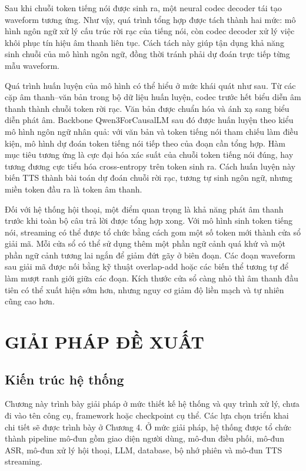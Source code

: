 \documentclass[a4paper,13pt,twoside]{report}
\begin{document}
Sau khi chuỗi token tiếng nói được sinh ra, một neural codec decoder tái tạo waveform tương ứng. Như vậy, quá trình tổng hợp được tách thành hai mức: mô hình ngôn ngữ xử lý cấu trúc rời rạc của tiếng nói, còn codec decoder xử lý việc khôi phục tín hiệu âm thanh liên tục. Cách tách này giúp tận dụng khả năng sinh chuỗi của mô hình ngôn ngữ, đồng thời tránh phải dự đoán trực tiếp từng mẫu waveform.

Quá trình huấn luyện của mô hình có thể hiểu ở mức khái quát như sau. Từ các cặp âm thanh--văn bản trong bộ dữ liệu huấn luyện, codec trước hết biểu diễn âm thanh thành chuỗi token rời rạc. Văn bản được chuẩn hóa và ánh xạ sang biểu diễn phát âm. Backbone Qwen3ForCausalLM sau đó được huấn luyện theo kiểu mô hình ngôn ngữ nhân quả: với văn bản và token tiếng nói tham chiếu làm điều kiện, mô hình dự đoán token tiếng nói tiếp theo của đoạn cần tổng hợp. Hàm mục tiêu tương ứng là cực đại hóa xác suất của chuỗi token tiếng nói đúng, hay tương đương cực tiểu hóa cross-entropy trên token sinh ra. Cách huấn luyện này biến TTS thành bài toán dự đoán chuỗi rời rạc, tương tự sinh ngôn ngữ, nhưng miền token đầu ra là token âm thanh.

Đối với hệ thống hội thoại, một điểm quan trọng là khả năng phát âm thanh trước khi toàn bộ câu trả lời được tổng hợp xong. Với mô hình sinh token tiếng nói, streaming có thể được tổ chức bằng cách gom một số token mới thành cửa sổ giải mã. Mỗi cửa sổ có thể sử dụng thêm một phần ngữ cảnh quá khứ và một phần ngữ cảnh tương lai ngắn để giảm đứt gãy ở biên đoạn. Các đoạn waveform sau giải mã được nối bằng kỹ thuật overlap-add hoặc các biến thể tương tự để làm mượt ranh giới giữa các đoạn. Kích thước cửa sổ càng nhỏ thì âm thanh đầu tiên có thể xuất hiện sớm hơn, nhưng nguy cơ giảm độ liền mạch và tự nhiên cũng cao hơn.

\chapter{GIẢI PHÁP ĐỀ XUẤT}

\section{Kiến trúc hệ thống}

Chương này trình bày giải pháp ở mức thiết kế hệ thống và quy trình xử lý, chưa đi vào tên công cụ, framework hoặc checkpoint cụ thể. Các lựa chọn triển khai chi tiết sẽ được trình bày ở Chương 4. Ở mức giải pháp, hệ thống được tổ chức thành pipeline mô-đun gồm giao diện người dùng, mô-đun điều phối, mô-đun ASR, mô-đun xử lý hội thoại, LLM, database, bộ nhớ phiên và mô-đun TTS streaming.
\end{document}
